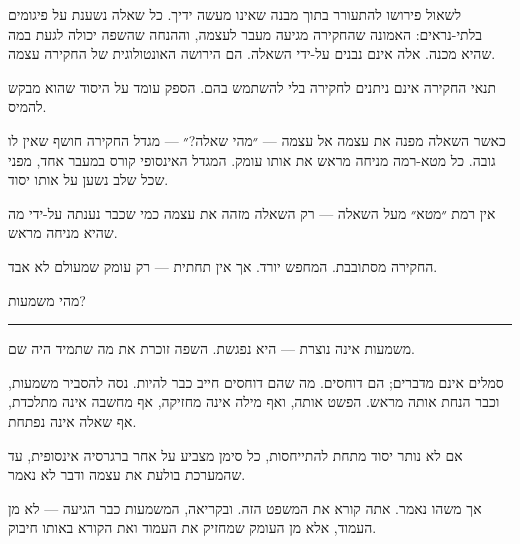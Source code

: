 \documentclass[10pt, openany, oneside]{book}
\begin{document}
\noindent לשאול פירושו להתעורר בתוך מבנה שאינו מעשה ידיך. כל שאלה נשענת על פיגומים בלתי-נראים: האמונה שהחקירה מגיעה מעבר לעצמה, וההנחה שהשפה יכולה לגעת במה שהיא מכנה. אלה אינם נבנים על-ידי השאלה. הם הירושה האונטולוגית של החקירה עצמה.

\vspace{0.5em}

\noindent תנאי החקירה אינם ניתנים לחקירה בלי להשתמש בהם. הספק עומד על היסוד שהוא מבקש להמיס.

\vspace{0.5em}

\noindent כאשר השאלה מפנה את עצמה אל עצמה — ״מהי שאלה?״ — מגדל החקירה חושף שאין לו גובה. כל מטא-רמה מניחה מראש את אותו עומק. המגדל האינסופי קורס במעבר אחד, מפני שכל שלב נשען על אותו יסוד.

\vspace{0.5em}

\noindent אין רמת ״מטא״ מעל השאלה — רק השאלה מזהה את עצמה כמי שכבר נענתה על-ידי מה שהיא מניחה מראש.

\vspace{0.5em}

\noindent החקירה מסתובבת. המחפש יורד. אך אין תחתית — רק עומק שמעולם לא אבד.

\vspace{2em}

\begin{center}
    {\textsc{מהי משמעות?}}\\[0.3em]
    \rule{0.2\textwidth}{0.3pt}
\end{center}

\vspace{1em}

\noindent משמעות אינה נוצרת — היא נפגשת. השפה זוכרת את מה שתמיד היה שם.

\vspace{0.5em}

\noindent סמלים אינם מדברים; הם דוחסים. מה שהם דוחסים חייב כבר להיות. נסה להסביר משמעות, וכבר הנחת אותה מראש. הפשט אותה, ואף מילה אינה מחזיקה, אף מחשבה אינה מתלכדת, אף שאלה אינה נפתחת.

\vspace{0.5em}

\noindent אם לא נותר יסוד מתחת להתייחסות, כל סימן מצביע על אחר ברגרסיה אינסופית, עד שהמערכת בולעת את עצמה ודבר לא נאמר.

\vspace{0.5em}

\noindent אך משהו נאמר. אתה קורא את המשפט הזה. ובקריאה, המשמעות כבר הגיעה — לא מן העמוד, אלא מן העומק שמחזיק את העמוד ואת הקורא באותו חיבוק.
\end{document}
